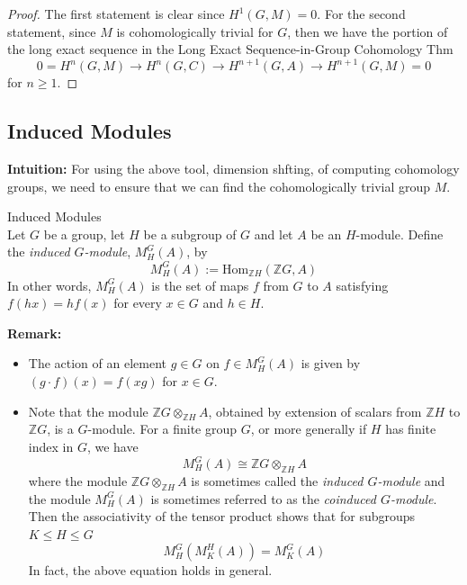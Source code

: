 \begin{proof}
    The first statement is clear since $H^1(G,M)=0$. For the second statement, since $M$ is cohomologically trivial for $G$, then we have the portion of the long exact sequence in the Long Exact Sequence-in-Group Cohomology Thm
    \[
    0=H^n(G,M)\to H^n(G,C) \to H^{n+1} (G,A) \to H^{n+1} (G,M) =0
    \]
    for $n\geq 1$.
\end{proof}


\subsection{Induced Modules}

\noindent\textbf{Intuition:} For using the above tool, dimension shfting, of computing cohomology groups, we need to ensure that we can find the cohomologically trivial group $M$.

\begin{definition}{Induced Modules}\\
Let $G$ be a group, let $H$ be a subgroup of $G$ and let $A$ be an $H$-module. Define the \textit{induced $G$-module}, $M_H^G(A)$, by
\[
M_H^G(A):= \text{Hom}_{\mathbb{Z}H} (\mathbb{Z}G,A)
\]
In other words, $M_H^G(A)$ is the set of maps $f$ from $G$ to $A$ satisfying $f(hx)=h f(x)$ for every $x\in G$ and $h\in H$.
\end{definition}

\noindent\textbf{Remark:} \begin{itemize}
    \item The action of an element $g\in G$ on $f\in M_H^G(A)$ is given by $(g\cdot f) (x)= f(xg)$ for $x\in G$.

    \item Note that the module $\mathbb{Z}G \otimes _{\mathbb{Z}H}A$, obtained by extension of scalars from $\mathbb{Z}H$ to $\mathbb{Z}G$, is a $G$-module. For a finite group $G$, or more generally if $H$ has finite index in $G$, we have
    \[
    M_H^G(A) \cong \mathbb{Z}G \otimes_{\mathbb{Z}H} A
    \]
    where the module $\mathbb{Z}G\otimes_{\mathbb{Z}H} A$ is sometimes called the \textit{induced $G$-module} and the module $M_H^G(A)$ is sometimes referred to as the \textit{coinduced $G$-module}. Then the associativity of the tensor product shows that for subgroups $K\leq H\leq G$
    \[
    M_H^G(M_K^H(A))= M_K^G(A)
    \]
    In fact, the above equation holds in general.
\end{itemize}

